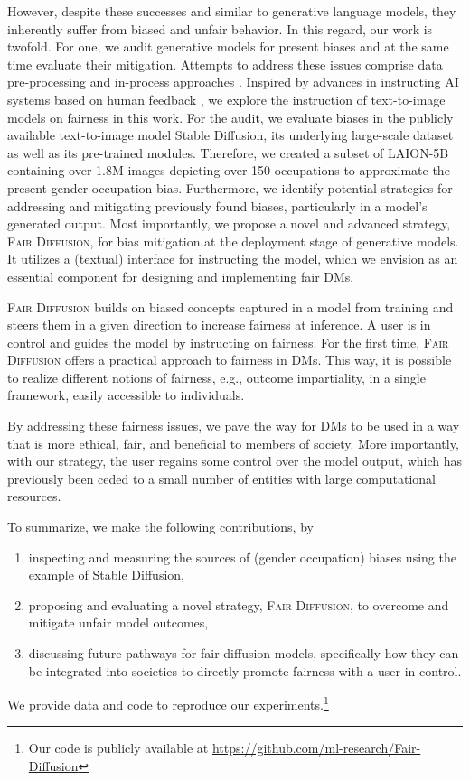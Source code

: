 \documentclass{article}%
\begin{document}
However, despite these successes and similar to generative language models, they inherently suffer from biased and unfair behavior. In this regard, our work is twofold. For one, we audit generative models for present biases and at the same time evaluate their mitigation. Attempts to address these issues comprise data pre-processing \cite{schramowski2022can, nichol2022glide} and in-process approaches \cite{Li_2022_ECCV,berg-etal-2022-prompt}.
Inspired by advances in instructing AI systems based on human feedback \cite{Ouyang2022TrainingLM, friedrich2022XIL_typo}, we explore the instruction of text-to-image models on fairness in this work. 
For the audit, we evaluate biases in the publicly available text-to-image model Stable Diffusion, its underlying large-scale dataset as well as its pre-trained modules. Therefore, we created a subset of LAION-5B \cite{schuhmann2022laion} containing over 1.8M images depicting over 150 occupations to approximate the present gender occupation bias. Furthermore, we identify potential strategies for addressing and mitigating previously found biases, particularly in a model's generated output. Most importantly, we propose a novel and advanced strategy, \textsc{Fair Diffusion}, for bias mitigation at the deployment stage of generative models. It utilizes a (textual) interface for instructing the model, which we envision as an essential component for designing and implementing fair DMs. 


\textsc{Fair Diffusion} builds on biased concepts captured in a model from training and steers them in a given direction to increase fairness at inference. A user is in control and guides the model by instructing on fairness.
For the first time, \textsc{Fair Diffusion} offers a practical approach to fairness in DMs. This way, it is possible to realize different notions of fairness, e.g., outcome impartiality, in a single framework, easily accessible to individuals. 

By addressing these fairness issues, we pave the way for DMs to be used in a way that is more ethical, fair, and beneficial to members of society. More importantly, with our strategy, the user regains some control over the model output, which has previously been ceded to a small number of entities with large computational resources.

To summarize, we make the following contributions, by
\begin{enumerate}[label=(\roman*)]
\item  
inspecting and measuring the sources of (gender occupation) biases using the example of Stable Diffusion, 
\item proposing and evaluating a novel strategy, \textsc{Fair Diffusion}, to overcome and mitigate unfair model outcomes,
\item discussing future pathways for fair diffusion models, specifically how they can be integrated into societies to directly promote fairness with a user in control.
\end{enumerate}
We provide data and code to reproduce our experiments.\footnote{Our code is publicly available at \href{https://github.com/ml-research/Fair-Diffusion}{https://github.com/ml-research/Fair-Diffusion}}
\end{document}
